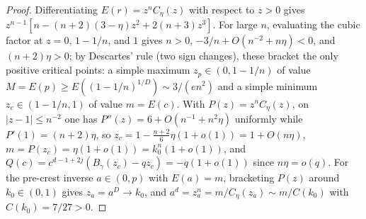 \begin{proof}
Differentiating $E(r)=z^n C_\eta(z)$ with respect to $z>0$ gives
$z^{n-1}[n-(n+2)(3-\eta)z^2+2(n+3)z^3]$. For large $n$, evaluating the cubic factor at $z=0$, $1-1/n$,
and $1$ gives $n>0$, $-3/n+O(n^{-2}+n\eta)<0$, and $(n+2)\eta>0$; by Descartes' rule (two sign
changes), these bracket the only positive critical points: a simple maximum $z_p\in(0,1-1/n)$ of value
$M=E(p)\ge E((1-1/n)^{1/D})\sim 3/(e n^2)$ and a simple minimum $z_c\in(1-1/n,1)$ of value $m=E(c)$.
With $P(z)=z^n C_\eta(z)$, on $|z-1|\le n^{-2}$ one has $P''(z)=6+O(n^{-1}+n^2\eta)$ uniformly while
$P'(1)=(n+2)\eta$, so $z_c=1-\frac{n+2}{6}\eta(1+o(1))=1+O(n\eta)$,
$m=P(z_c)=\eta(1+o(1))=k_0^n(1+o(1))$, and $Q(c)=c^{d-1+2j}(B_\gamma(z_c)-qz_c)=-q(1+o(1))$ since
$n\eta=o(q)$. For the pre-crest inverse $a\in(0,p)$ with $E(a)=m$, bracketing $P(z)$ around
$k_0\in(0,1)$ gives $z_a=a^D\to k_0$, and $a^d=z_a^n=m/C_\eta(z_a)\sim m/C(k_0)$ with $C(k_0)=7/27>0$.


\end{proof}
